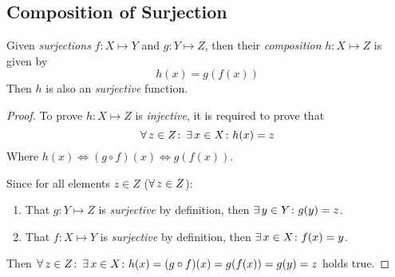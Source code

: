 \subsection{Composition of Surjection}
\begin{proposition}
    Given \textit{surjections} $f \colon X \mapsto Y$ and $g \colon Y \mapsto Z$, then their \textit{composition} $h \colon X \mapsto Z$ is given by
    \begin{equation}
        h(x) = g(f(x))
    \end{equation}
    Then $h$ is also an \textit{surjective} function.
\end{proposition}

\begin{proof}
    To prove $h \colon X \mapsto Z$ is \textit{injective}, it is required to prove that
    \begin{equation}
        \operatorname{\forall} z \in Z \colon \operatorname{\exists} x \in X \colon h(x) = z
    \end{equation}
    Where $h(x) \Leftrightarrow (g \circ f)(x) \Leftrightarrow g(f(x))$.
    
    Since for all elements $z \in Z$ ($\operatorname{\forall} z \in Z$):
    \begin{enumerate}
        \item That $g \colon Y \mapsto Z$ is \textit{surjective} by definition, then $\operatorname{\exists} y \in Y \colon g(y) = z$.
        \item That $f \colon X \mapsto Y$ is \textit{surjective} by definition, then $\operatorname{\exists} x \in X \colon f(x) = y$.
    \end{enumerate}
    Then $\operatorname{\forall} z \in Z \colon \operatorname{\exists} x \in X \colon h(x) = (g \circ f)(x) = g(f(x)) = g(y) = z$ holds true.
\end{proof}
